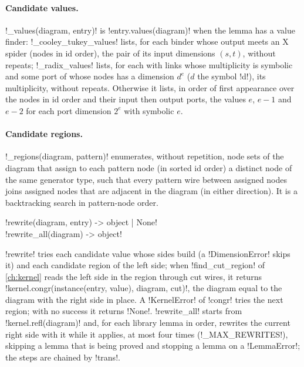 \paragraph{Candidate values.} \py!_values(diagram, entry)! is \py!entry.values(diagram)! when the lemma has a value finder: \py!_cooley_tukey_values! lists, for each binder whose output meets an X spider (nodes in id order), the pair of its input dimensions $(s,t)$, without repeats; \py!_radix_values! lists, for each \bbox{} with links whose multiplicity is symbolic and some port of whose nodes has a dimension $d^e$ ($d$ the symbol \code!d!), its multiplicity, without repeats. Otherwise it lists, in order of first appearance over the nodes in id order and their input then output ports, the values $e$, $e-1$ and $e-2$ for each port dimension $2^e$ with symbolic $e$.

\paragraph{Candidate regions.} \py!_regions(diagram, pattern)! enumerates, without repetition, node sets of the diagram that assign to each pattern node (in sorted id order) a distinct node of the same generator type, such that every pattern wire between assigned nodes joins assigned nodes that are adjacent in the diagram (in either direction). It is a backtracking search in pattern-node order.

\begin{signature}
\py!rewrite(diagram, entry) -> object | None!\\
\py!rewrite_all(diagram) -> object!
\end{signature}
\py!rewrite! tries each candidate value whose sides build (a \py!DimensionError! skips it) and each candidate region of the left side; when \py!find_cut_region! of \cref{ch:kernel} reads the left side in the region through cut wires, it returns \py!kernel.congr(instance(entry, value), diagram, cut)!, the diagram equal to the diagram with the right side in place. A \py!KernelError! of \py!congr! tries the next region; with no success it returns \py!None!. \py!rewrite_all! starts from \py!kernel.refl(diagram)! and, for each library lemma in order, rewrites the current right side with it while it applies, at most four times (\py!_MAX_REWRITES!), skipping a lemma that is being proved and stopping a lemma on a \py!LemmaError!; the steps are chained by \py!trans!.

